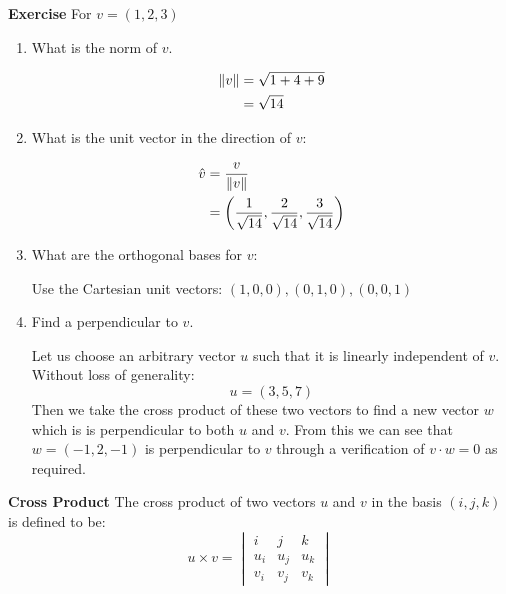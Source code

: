\begin{cBox}
	\textbf{Exercise}
	For $v = (1,2,3)$
	\begin{enumerate}
		\item What is the norm of $v$.
			\begin{solution}	
			\begin{align*}
				\left\lVert v\right\rVert & = \sqrt{1 + 4 + 9}\\
				& = \sqrt{14}
			\end{align*}
		\end{solution}
		\item What is the unit vector in the direction of $v$:
			\begin{solution}
			\begin{align*}
				\hat{v} & = \frac{v}{\left\lVert v\right\rVert}\\
				& = \left( \frac{1}{\sqrt{14}}, \frac{2}{\sqrt{14}}, \frac{3}{\sqrt{14}} \right)
			\end{align*}
		\end{solution}
		\item What are the orthogonal bases for $v$:
		\begin{solution}
		Use the Cartesian unit vectors:
			$(1,0,0) , (0,1,0), (0,0,1)$
		\end{solution}
	\item Find a perpendicular to $v$.
		\begin{solution}
			Let us choose an arbitrary vector $u$ such that it is linearly independent of $v$. Without loss of generality:
			\begin{equation}
				u = (3,5,7)
			\end{equation}
		Then we take the cross product of these two vectors to find a new vector $w$ which is is perpendicular to both $u$ and $v$. From this we can see that $w = (-1,2,-1)$ is perpendicular to $v$ through a verification of $v \cdot w = 0$ as required.
		\end{solution}
	\end{enumerate}
	\begin{ddef}
		\textbf{Cross Product} The cross product of two vectors $u$ and $v$ in the basis $(i,j,k)$ is defined to be:
		\begin{equation}
			u \times v = \begin{vmatrix}
			i & j & k\\
			u_i & u_j & u_k\\
			v_i & v_j & v_k
			\end{vmatrix}
		\end{equation}
	\end{ddef}
\end{cBox}
